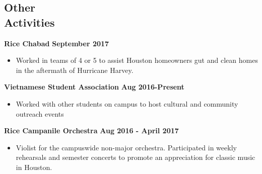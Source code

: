 \documentclass[margin,line]{resume}
\begin{document}
\begin{resume}
    \section{\mysidestyle Other\\ Activities}
    \textbf{Rice Chabad} \hfill \textbf{September 2017}
    \begin{itemize}
    \item Worked in teams of 4 or 5 to assist Houston homeowners gut and clean homes in the aftermath of Hurricane Harvey.
    \end{itemize}
    \vspace{-3mm}
    \textbf{Vietnamese Student Association} \hfill \textbf{Aug 2016-Present}
    \begin{itemize}
    \item Worked with other students on campus to host cultural and community outreach events
    \end{itemize}
    \vspace{-3mm}
    \textbf{Rice Campanile Orchestra} \hfill \textbf{Aug 2016 - April 2017}
    \begin{itemize}
    \item Violist for the campuswide non-major orchestra.
    Participated in weekly rehearsals and semester concerts to promote an appreciation for classic music in Houston.
    \end{itemize}




\end{resume}
\end{document}
